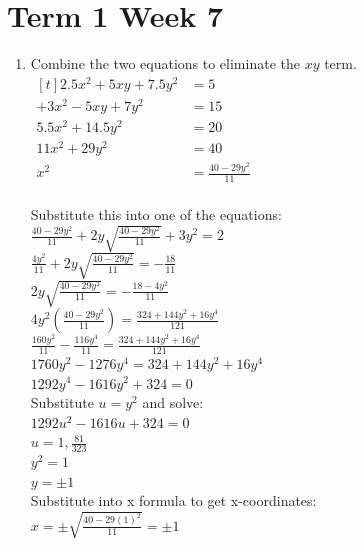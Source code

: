 \documentclass[../main.tex]{subfiles}
\begin{document}
\section*{Term 1 Week 7}
\begin{enumerate}
    \item 
    Combine the two equations to eliminate the \(xy\) term.\\
    $
    \!
    \begin{aligned}[t]
        2.5x^2+5xy+7.5y^2
        &=5\\
        +3x^2-5xy+7y^2
        &=15\\ 
        5.5x^2+14.5y^2
        &=20\\
        11x^2+29y^2
        &=40\\
        x^2
        &=\frac{40-29y^2}{11}\\
    \end{aligned}
    $
    
    Substitute this into one of the equations:\\
    \(\frac{40-29y^2}{11}+2y\sqrt{\frac{40-29y^2}{11}}+3y^2=2\)\\

    \(\frac{4y^2}{11}+2y\sqrt{\frac{40-29y^2}{11}}=-\frac{18}{11}\)\\

    \(2y\sqrt{\frac{40-29y^2}{11}}=-\frac{18-4y^2}{11}\)\\

    \(4y^2(\frac{40-29y^2}{11})=\frac{324+144y^2+16y^4}{121}\)\\

    \(\frac{160y^2}{11}-\frac{116y^4}{11}=\frac{324+144y^2+16y^4}{121}\)\\

    \(1760y^2-1276y^4=324+144y^2+16y^4\)\\

    \(1292y^4-1616y^2+324=0\)\\

    Substitute \(u=y^2\) and solve:\\
    \(1292u^2-1616u+324=0\)\\
    \(u=1, \frac{81}{323}\)\\

    \(y^2=1\)\\
    \(y=\pm 1\)\\
    Substitute into x formula to get x-coordinates:\\
    \(x=\pm \sqrt{\frac{40-29(1)^2}{11}}=\pm 1\)\\


\end{enumerate}
\end{document}
